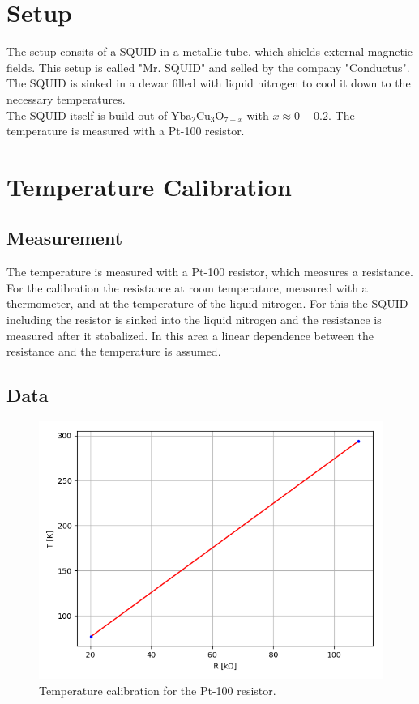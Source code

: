 \documentclass[12pt,a4paper]{article}
\begin{document}
\section{Setup}
The setup consits of a SQUID in a metallic tube, which shields external magnetic fields. This setup is called "Mr. SQUID" and selled by the company "Conductus". The SQUID is sinked in a dewar filled with liquid nitrogen to cool it down to the necessary temperatures. \\
The SQUID itself is build out of Yba$_2$Cu$_3$O$_{7-x}$ with $x \approx 0-0.2$. The temperature is measured with a Pt-100 resistor.


\section{Temperature Calibration}
\subsection{Measurement}
The temperature is measured with a Pt-100 resistor, which measures a resistance. For the calibration the resistance at room temperature, measured with a thermometer, and at the temperature of the liquid nitrogen. For this the SQUID including the resistor is sinked into the liquid nitrogen and the resistance is measured after it stabalized. In this area a linear dependence between the resistance and the temperature is assumed.

\subsection{Data}

\begin{figure} [H]
\centering
\includegraphics[scale=0.8]{Bilder/Temp_kalibration.PNG}
\caption{Temperature calibration for the Pt-100 resistor.}
\label{fig:Temp_kalibration}
\end{figure}
\end{document}
